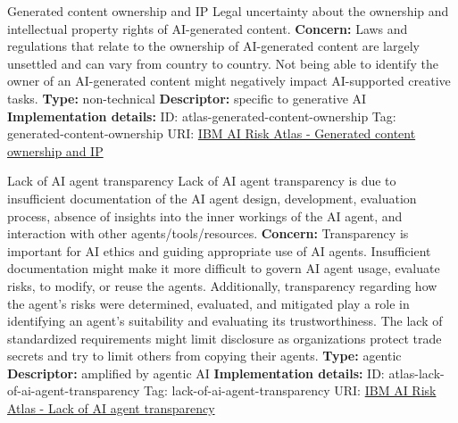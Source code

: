 \documentclass[a4paper,12pt]{article}
\begin{document}
\begin{definitionbox}{Generated content ownership and IP}
Legal uncertainty about the ownership and intellectual property rights of AI-generated content.\newline\newline
\textbf{Concern: }Laws and regulations that relate to the ownership of AI-generated content are largely unsettled and can vary from country to country. Not being able to identify the owner of an AI-generated content might negatively impact AI-supported creative tasks.\newline\newline
\textbf{Type: }non-technical\newline
\textbf{Descriptor: }specific to generative AI \newline\newline
\textbf{Implementation details: } \newline
ID: atlas-generated-content-ownership \newline
Tag: generated-content-ownership \newline
URI:  \href{https://www.ibm.com/docs/en/watsonx/saas?topic=SSYOK8/wsj/ai-risk-atlas/generated-content-ownership.html}{IBM AI Risk Atlas - Generated content ownership and IP}\newline
\end{definitionbox}
\begin{definitionbox}{Lack of AI agent transparency}
Lack of AI agent transparency is due to insufficient documentation of the AI agent design, development, evaluation process, absence of insights into the inner workings of the AI agent, and interaction with other agents/tools/resources.\newline\newline
\textbf{Concern: }Transparency is important for AI ethics and guiding appropriate use of AI agents. Insufficient documentation might make it more difficult to govern AI agent usage, evaluate risks, to modify, or reuse the agents.  Additionally, transparency regarding how the agent's risks were determined, evaluated, and mitigated play a role in identifying an agent's suitability and evaluating its trustworthiness. The lack of standardized requirements might limit disclosure as organizations protect trade secrets and try to limit others from copying their agents.\newline\newline
\textbf{Type: }agentic\newline
\textbf{Descriptor: }amplified by agentic AI \newline\newline
\textbf{Implementation details: } \newline
ID: atlas-lack-of-ai-agent-transparency \newline
Tag: lack-of-ai-agent-transparency \newline
URI:  \href{https://www.ibm.com/docs/en/watsonx/saas?topic=SSYOK8/wsj/ai-risk-atlas/lack-of-ai-agent-transparency.html}{IBM AI Risk Atlas - Lack of AI agent transparency}\newline
\end{definitionbox}
\end{document}
